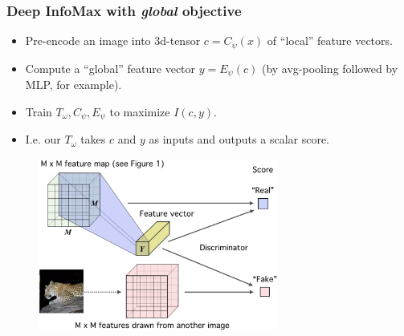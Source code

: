 \documentclass[10pt]{beamer}
\begin{document}
\begin{frame}
\frametitle{Deep InfoMax with \textit{global} objective}

\begin{itemize}
    \item\pause Pre-encode an image into 3d-tensor $c = C_\psi(x)$ of ``local'' feature vectors.
    \item\pause Compute a ``global'' feature vector $y = E_\psi(c)$ (by avg-pooling followed by MLP, for example).
    \item\pause Train $T_\omega, C_\psi, E_\psi$ to maximize $I(c, y)$.
    \item\pause I.e. our $T_\omega$ takes $c$ and $y$ as inputs and outputs a scalar score.
\end{itemize}

\pause
\begin{figure}
\centering
\includegraphics[width=0.7\textwidth]{images/dim_global.png}
\end{figure}

\end{frame}
\end{document}
